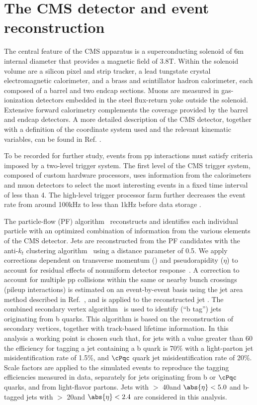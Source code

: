 \section{The CMS detector and event reconstruction}
\label{sect:CMSRec} 
The central feature of the CMS apparatus is a superconducting solenoid of 6\unit{m} 
internal diameter that provides a magnetic field of 3.8\unit{T}. Within the solenoid 
volume are a silicon pixel and strip tracker, a lead tungstate crystal electromagnetic 
calorimeter, and a brass and scintillator hadron calorimeter, each composed of a barrel 
and two endcap sections. Muons are measured in gas-ionization detectors embedded in the 
steel flux-return yoke outside the solenoid. Extensive forward calorimetry complements the coverage provided by the barrel and endcap detectors. 
A more detailed description of the CMS detector, together with a definition of the coordinate system used 
and the relevant kinematic variables, can be found in Ref. \cite{Chatrchyan:2008zzk}.

To be recorded for further study, events from pp interactions must satisfy criteria imposed by a two-level trigger system.
The first level of the CMS trigger system, composed of custom hardware processors, uses information from the 
calorimeters and muon detectors to select the most interesting events in a fixed time interval of less than 4\mus. 
The high-level trigger processor farm further decreases the event rate from around 100\unit{kHz} to less than 1\unit{kHz} 
before data storage \cite{Khachatryan:2016bia}.

The particle-flow (PF) algorithm~\cite{CMS-PAS-PFT-09-001,CMS-PAS-PFT-10-001} reconstructs and identifies each 
individual particle with an optimized combination of information from the various elements of the CMS detector. 
Jets are reconstructed from the PF candidates with the anti-$k_t$ clustering
algorithm~\cite{Cacciari:2008gp} using a distance parameter of 0.5.
We apply corrections dependent on transverse momentum (\pt) and pseudorapidity ($\eta$) 
to account for residual effects of nonuniform detector response~\cite{Chatrchyan:2011ds}.
A correction to account for multiple pp collisions within the same or nearby
bunch crossings (pileup interactions) is estimated on an event-by-event basis using the
jet area method described in Ref.~\cite{Cacciari:2007fd}, and is
applied to the reconstructed jet \pt.
The combined secondary vertex algorithm~\cite{Chatrchyan:2012jua} is used to identify (``b tag'') jets 
originating from b quarks.  This algorithm  is based on the reconstruction of secondary vertices, together with track-based lifetime information. 
In this analysis a working point is chosen such that, for jets with a \PT value greater than 60\GeV 
the efficiency for tagging a jet containing a b quark is 70\% with a light-parton jet misidentification rate of 1.5\%, 
and $\cPqc$ quark jet misidentification rate of 20\%.
Scale factors are applied to the simulated events to reproduce the tagging efficiencies measured in data, 
separately for jets originating from b or $\cPqc$ quarks, and from light-flavor partons.
Jets with  \PT $>$ 40\GeV and $\abs{\eta} < 5.0$ and b-tagged jets with \PT $>$ 20\GeV and $\abs{\eta} < 2.4$ are considered in this analysis.

